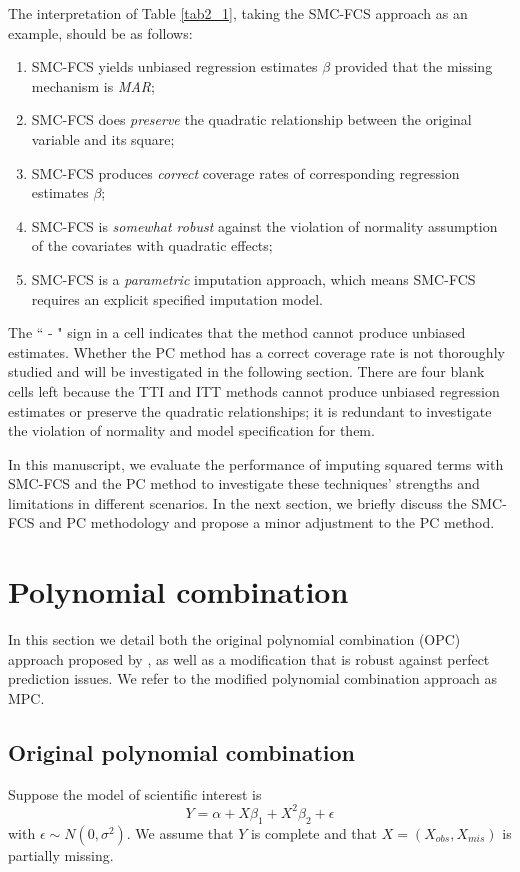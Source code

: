 	The interpretation of Table \ref{tab2_1}, taking the SMC-FCS approach as an example, should be as follows:
	\begin{enumerate}
		\item SMC-FCS yields unbiased regression estimates $\beta$ provided that the missing mechanism is \emph{MAR};
		\item SMC-FCS does \emph{preserve} the quadratic relationship between the original variable and its square;
		\item SMC-FCS produces \emph{correct} coverage rates of corresponding regression estimates $\beta$; 
		\item SMC-FCS is \emph{somewhat robust} against the violation of normality assumption of the covariates with quadratic effects;
		\item SMC-FCS is a \emph{parametric} imputation approach, which means SMC-FCS requires an explicit specified imputation model. 
	\end{enumerate}
	The `` - " sign in a cell indicates that the method cannot produce unbiased estimates. Whether the PC method has a correct coverage rate is not thoroughly studied and will be investigated in the following section. There are four blank cells left because the TTI and ITT methods cannot produce unbiased regression estimates or preserve the quadratic relationships; it is redundant to investigate the violation of normality and model specification for them.    
	
	In this manuscript, we evaluate the performance of imputing squared terms with SMC-FCS and the PC method to investigate these techniques' strengths and limitations in different scenarios. In the next section, we briefly discuss the SMC-FCS and PC methodology and propose a minor adjustment to the PC method.
	
	\section{Polynomial combination}
	In this section we detail both the original polynomial combination (OPC) approach proposed by \citet{Vink2013}, as well as a modification that is robust against perfect prediction issues. We refer to the modified polynomial combination approach as MPC. 
	\subsection{Original polynomial combination}
	Suppose the model of scientific interest is 
	\begin{equation}
		Y = \alpha + X\beta_{1} + X^2\beta_{2} +\epsilon
		\label{eqn2_1}
	\end{equation}
	with $\epsilon \sim N(0, \sigma^2)$. We assume that $Y$ is complete and that $X = (X_{obs}, X_{mis})$ is partially missing. 
	
